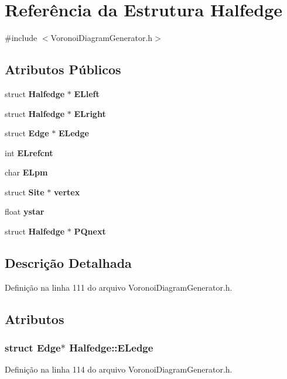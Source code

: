 \section{Referência da Estrutura Halfedge}
\label{struct_halfedge}


{\ttfamily \#include $<$Voronoi\+Diagram\+Generator.\+h$>$}

\subsection*{Atributos Públicos}
\begin{DoxyCompactItemize}
\item 
struct {\bf Halfedge} $\ast$ {\bf E\+Lleft}
\item 
struct {\bf Halfedge} $\ast$ {\bf E\+Lright}
\item 
struct {\bf Edge} $\ast$ {\bf E\+Ledge}
\item 
int {\bf E\+Lrefcnt}
\item 
char {\bf E\+Lpm}
\item 
struct {\bf Site} $\ast$ {\bf vertex}
\item 
float {\bf ystar}
\item 
struct {\bf Halfedge} $\ast$ {\bf P\+Qnext}
\end{DoxyCompactItemize}


\subsection{Descrição Detalhada}


Definição na linha 111 do arquivo Voronoi\+Diagram\+Generator.\+h.



\subsection{Atributos}
\subsubsection[{E\+Ledge}]{\setlength{\rightskip}{0pt plus 5cm}struct {\bf Edge}$\ast$ Halfedge\+::\+E\+Ledge}\label{struct_halfedge_a67af97a110444874f984693fb2f92774}


Definição na linha 114 do arquivo Voronoi\+Diagram\+Generator.\+h.

